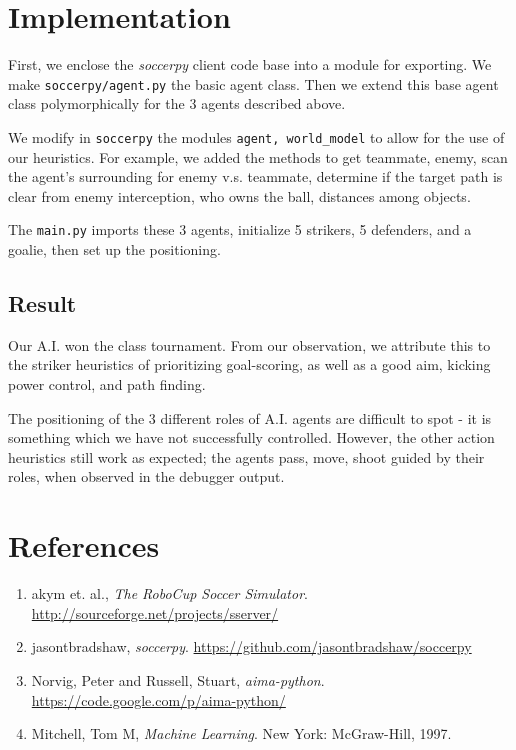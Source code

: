 \documentclass[12pt]{article}  %
\begin{document}
\section{Implementation}

First, we enclose the \emph{soccerpy} client code base into a module for exporting. We make {\tt soccerpy/agent.py} the basic agent class. Then we extend this base agent class polymorphically for the 3 agents described above.

We modify in {\tt soccerpy} the modules {\tt agent, world\_model} to allow for the use of our heuristics. For example, we added the methods to get teammate, enemy, scan the agent's surrounding for enemy v.s. teammate, determine if the target path is clear from enemy interception, who owns the ball, distances among objects.

The {\tt main.py} imports these 3 agents, initialize 5 strikers, 5 defenders, and a goalie, then set up the positioning.






\subsection{Result}

Our A.I. won the class tournament. From our observation, we attribute this to the striker heuristics of prioritizing goal-scoring, as well as a good aim, kicking power control, and path finding. 

The positioning of the 3 different roles of A.I. agents are difficult to spot - it is something which we have not successfully controlled. However, the other action heuristics still work as expected; the agents pass, move, shoot guided by their roles, when observed in the debugger output.



\section{References}


\begin{enumerate}

\item akym et. al., \emph{The RoboCup Soccer Simulator}. \url{http://sourceforge.net/projects/sserver/}\label{sim}

\item jasontbradshaw, \emph{soccerpy}. \url{https://github.com/jasontbradshaw/soccerpy}\label{client}

\item Norvig, Peter and Russell, Stuart, \emph{aima-python}. \url{https://code.google.com/p/aima-python/}\label{aima}

\item Mitchell, Tom M, \emph{Machine Learning}. New York: McGraw-Hill, 1997.\label{Mitchell}



\end{enumerate}
\end{document}
